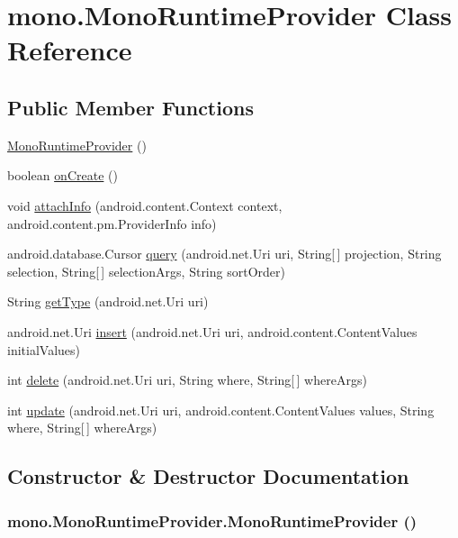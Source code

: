 \hypertarget{classmono_1_1_mono_runtime_provider}{
\section{mono.MonoRuntimeProvider Class Reference}
\label{classmono_1_1_mono_runtime_provider}
}
\subsection*{Public Member Functions}
\begin{CompactItemize}
\item 
\hyperlink{classmono_1_1_mono_runtime_provider_7a06cc58b7a7891aa5f1e523206a5249}{MonoRuntimeProvider} ()
\item 
boolean \hyperlink{classmono_1_1_mono_runtime_provider_c5640d3ce8472accc1953fe591e683c3}{onCreate} ()
\item 
void \hyperlink{classmono_1_1_mono_runtime_provider_4fb9f5a38268fb642d211e7ef0fd9228}{attachInfo} (android.content.Context context, android.content.pm.ProviderInfo info)
\item 
android.database.Cursor \hyperlink{classmono_1_1_mono_runtime_provider_5f038667e16324d54f940968f4abd86f}{query} (android.net.Uri uri, String\mbox{[}$\,$\mbox{]} projection, String selection, String\mbox{[}$\,$\mbox{]} selectionArgs, String sortOrder)
\item 
String \hyperlink{classmono_1_1_mono_runtime_provider_b7978ccd79378f86aabc9a1997bff129}{getType} (android.net.Uri uri)
\item 
android.net.Uri \hyperlink{classmono_1_1_mono_runtime_provider_fbf0b2575d76132ac379064f3f695013}{insert} (android.net.Uri uri, android.content.ContentValues initialValues)
\item 
int \hyperlink{classmono_1_1_mono_runtime_provider_20fd29ee82e2fbc6ca8e3a7d53e89b9f}{delete} (android.net.Uri uri, String where, String\mbox{[}$\,$\mbox{]} whereArgs)
\item 
int \hyperlink{classmono_1_1_mono_runtime_provider_70342b01de97d26ab215db961f4a714c}{update} (android.net.Uri uri, android.content.ContentValues values, String where, String\mbox{[}$\,$\mbox{]} whereArgs)
\end{CompactItemize}


\subsection{Constructor \& Destructor Documentation}
\hypertarget{classmono_1_1_mono_runtime_provider_7a06cc58b7a7891aa5f1e523206a5249}{
\subsubsection[{MonoRuntimeProvider}]{\setlength{\rightskip}{0pt plus 5cm}mono.MonoRuntimeProvider.MonoRuntimeProvider ()}}
\label{classmono_1_1_mono_runtime_provider_7a06cc58b7a7891aa5f1e523206a5249}




